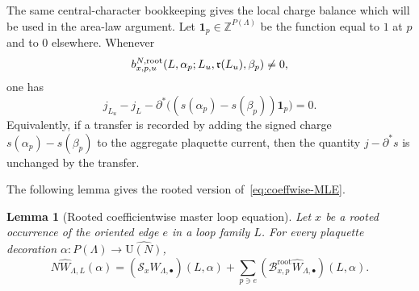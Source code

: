\documentclass[11pt,a4paper,reqno]{amsart}
\newtheorem{lemma}[theorem]{Lemma}
\theoremstyle{definition}
\theoremstyle{remark}
\newcommand\U{{\mathrm U}}
\newcommand\Z{{\mathbb{Z}}}
\begin{document}
The same central-character bookkeeping gives the local charge balance which will be used in the area-law argument.  Let $\boldsymbol 1_p\in\Z^{P(\Lambda)}$ be the function equal to $1$ at $p$ and to $0$ elsewhere.  Whenever
\[
b^{N,{\rm root}}_{x,p,u}(L,\alpha_p;L_u,\mathfrak r(L_u),\beta_p)\neq0,
\]
one has
\begin{equation}\label{eq:local-reduced-charge-balance}
j_{L_u}-j_L-\partial^*\bigl((s(\alpha_p)-s(\beta_p))\boldsymbol 1_p\bigr)=0.
\end{equation}
Equivalently, if a transfer is recorded by adding the signed charge $s(\alpha_p)-s(\beta_p)$ to the aggregate plaquette current, then the quantity $j-\partial^*s$ is unchanged by the transfer.



The following lemma gives the rooted version of~\eqref{eq:coeffwise-MLE}.

\begin{lemma}[Rooted coefficientwise master loop equation]\label{lem:rooted-coeff-normal-form}
Let $x$ be a rooted occurrence of the oriented edge $e$ in a loop family $L$.  For every plaquette decoration $\alpha:P(\Lambda)\to\widehat{\U(N)}$,
\begin{equation}\label{eq:rooted-coeff-MLE}
N\widehat W_{\Lambda,L}(\alpha)
=
(\mathscr S_x\widehat W_{\Lambda,\bullet})(L,\alpha)
+
\sum_{p\ni e}(\mathscr B^{\mathrm{root}}_{x,p}\widehat W_{\Lambda,\bullet})(L,\alpha).
\end{equation}
\end{lemma}
\end{document}
